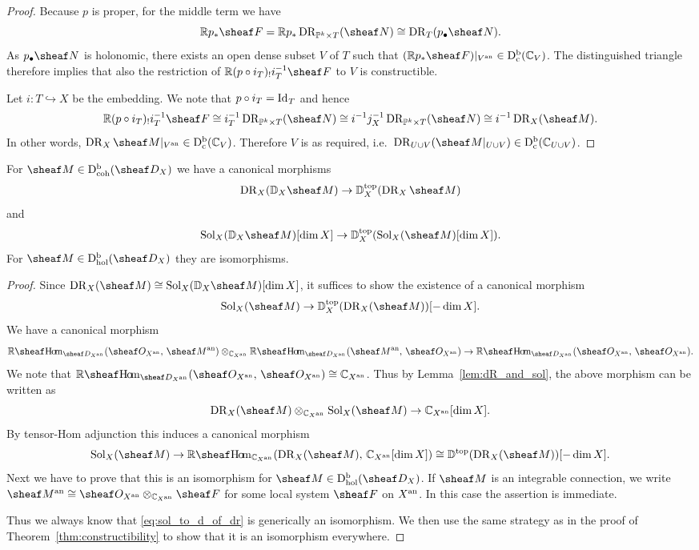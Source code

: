 \documentclass[number-in-sections,a4paper]{notes}
\begin{document}
\begin{proof}
    Because $p$ is proper, for the middle term we have
    \[
        \RR p_* \sheaf F =
        \RR p_* \DR_{\ps k \times T}(\sheaf N) \cong
        \DR_T(p_\bullet \sheaf N).
    \]
    As $p_\bullet\sheaf N$ is holonomic, there exists an open dense subset $V$ of $T$ such that $\res{(\RR p_* \sheaf F)}{V^\an} \in \catDbConstr{V}$.
    The distinguished triangle therefore implies that also the restriction of $\RR ( p \circ i_T)_!i_T^{-1} \sheaf F$ to $V$ is constructible.
    
    Let $i\colon T \hookrightarrow X$ be the embedding.
    We note that $p \circ i_T = {\mathrm{Id}_{}}_T$ and hence
    \[
        \RR ( p \circ i_T)_!i_T^{-1} \sheaf F \cong
        i_T^{-1} \DR_{\ps k \times T}(\sheaf N) \cong
        i^{-1} j_X^{-1} \DR_{\ps k \times T}(\sheaf N) \cong
        i^{-1} \DR_{X}(\sheaf M).
    \]
    In other words, $\res{\DR_X\sheaf M}{V^\an} \in \catDbConstr{V}$.
    Therefore $V$ is as required, i.e.~$\DR_{U \cup V}(\res{\sheaf M}{U \cup V}) \in \catDbConstr{U \cup V}$.
\end{proof}

\begin{Theorem}
    For $\sheaf M \in \catDbDModcoh{X}$ we have a canonical morphisms 
    \[
        \DR_X(\DD_X \sheaf M) \to \topDD_X(\DR_X \sheaf M)
    \]
    and
    \[
        \Sol_X(\DD_X\sheaf M)[\dim X] \to \topDD_X(\Sol_X(\sheaf M)[\dim X]).
    \]
    For $\sheaf M \in \catDbDModhol{X}$ they are isomorphisms.
\end{Theorem}

\begin{proof}
    Since $\DR_X(\sheaf M) \cong \Sol_X(\DD_X \sheaf M)[\dim X]$, it suffices to show the existence of a canonical morphism
    \[
        \Sol_X(\sheaf M) \to \topDD_X(\DR_X(\sheaf M))[-\dim X].
    \]
    We have a canonical morphism
    \[
        \RsheafHom_{\sD_{X^\an}}(\sO_{X^\an},\, \sheaf M^\an) \otimes_{\CC_{X^\an}} \sheafRHom_{\sD_{X^\an}}(\sheaf M^\an,\, \sO_{X^\an})
        \to
        \RsheafHom_{\sD_{X^\an}}(\sO_{X^\an},\, \sO_{X^\an}).
    \]
    We note that $\RsheafHom_{\sD_{X^\an}}(\sO_{X^\an},\, \sO_{X^\an}) \cong \CC_{X^\an}$.
    Thus by Lemma~\ref{lem:dR_and_sol}, the above morphism can be written as
    \[
        \DR_X(\sheaf M) \otimes_{\CC_{X^\an}} \Sol_X(\sheaf M) \to \CC_{X^\an}[\dim X].
    \]
    By tensor-Hom adjunction this induces a canonical morphism
    \begin{equation}\label{eq:sol_to_d_of_dr}
        \Sol_X(\sheaf M) \to \sheafRHom_{\CC_{X^\an}}(\DR_X(\sheaf M),\, \CC_{X^\an}[\dim X]) \cong \topDD(\DR_X(\sheaf M))[-\dim X].
    \end{equation}
    Next we have to prove that this is an isomorphism for $\sheaf M \in \catDbDModhol{X}$.
    If $\sheaf M$ is an integrable connection, we write $\sheaf M^\an \cong \sO_{X^\an} \otimes_{\CC_{X^\an}} \sheaf F$ for some local system $\sheaf F$ on $X^{\mathrm{an}}$.
    In this case the assertion is immediate.

    Thus we always know that \eqref{eq:sol_to_d_of_dr} is generically an isomorphism.
    We then use the same strategy as in the proof of Theorem~\ref{thm:constructibility} to show that it is an isomorphism everywhere.
\end{proof}
\end{document}
